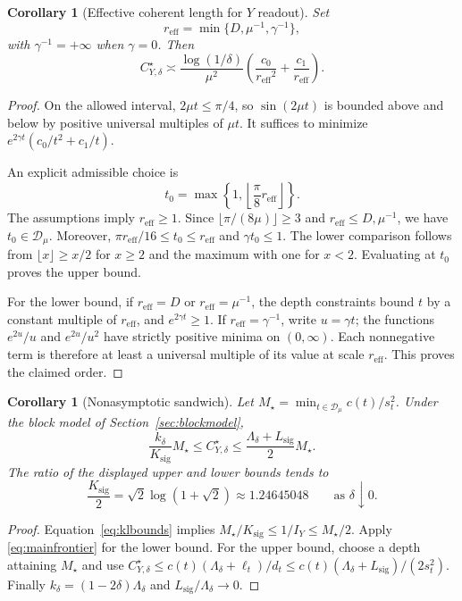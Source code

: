 \documentclass[11pt,a4paper]{article}
\newcommand{\reff}{r_{\mathrm{eff}}}
\newtheorem{corollary}[theorem]{Corollary}
\theoremstyle{definition}
\theoremstyle{remark}
\numberwithin{equation}{section}
\begin{document}
\begin{corollary}[Effective coherent length for $Y$ readout]\label{cor:effective}
Set
\begin{equation}
 {\reff}=\min\{D,\mu^{-1},\gamma^{-1}\},
\end{equation}
with $\gamma^{-1}=+\infty$ when $\gamma=0$. Then
\begin{equation}\label{eq:effectiver}
 C_{Y,\delta}^\star\asymp
 \frac{\log(1/\delta)}{\mu^2}
 \left(\frac{c_0}{{\reff}^2}+\frac{c_1}{{\reff}}\right).
\end{equation}
\end{corollary}
\begin{proof}
On the allowed interval, $2\mu t\leq\pi/4$, so
$\sin(2\mu t)$ is bounded above and below by positive universal multiples
of $\mu t$. It suffices to minimize
$e^{2\gamma t}(c_0/t^2+c_1/t)$.

An explicit admissible choice is
\[
 t_0=\max\left\{1,\left\lfloor\frac{\pi}{8}{\reff}\right\rfloor\right\}.
\]
The assumptions imply ${\reff}\geq1$. Since
$\lfloor\pi/(8\mu)\rfloor\geq3$ and ${\reff}\leq D,\mu^{-1}$,
we have $t_0\in\mathcal D_\mu$. Moreover,
$\pi{\reff}/16\leq t_0\leq{\reff}$ and $\gamma t_0\leq1$.
The lower comparison follows from $\lfloor x\rfloor\geq x/2$ for
$x\geq2$ and the maximum with one for $x<2$.
Evaluating at $t_0$ proves the upper bound.

For the lower bound, if ${\reff}=D$ or ${\reff}=\mu^{-1}$, the depth constraints
bound $t$ by a constant multiple of ${\reff}$, and $e^{2\gamma t}\geq1$.
If ${\reff}=\gamma^{-1}$, write $u=\gamma t$; the functions
$e^{2u}/u$ and $e^{2u}/u^2$ have strictly positive minima on $(0,\infty)$.
Each nonnegative term is therefore at least a universal multiple of its
value at scale ${\reff}$. This proves the claimed order.
\end{proof}

\begin{corollary}[Nonasymptotic sandwich]\label{cor:sandwich}
Let $M_\star=\min_{t\in\mathcal D_\mu}c(t)/s_t^2$. Under the block model of Section~\ref{sec:blockmodel},
\begin{equation}\label{eq:sandwich}
\frac{k_\delta}{K_{\mathrm{sig}}}M_\star
\le C_{Y,\delta}^\star
\le\frac{\Lambda_\delta+L_{\mathrm{sig}}}{2}M_\star.
\end{equation}
The ratio of the displayed upper and lower bounds tends to
\begin{equation}\label{eq:boost-sandwich-factor}
\frac{K_{\mathrm{sig}}}{2}=\sqrt2\log(1+\sqrt2)\approx1.24645048
\qquad\text{as }\delta\downarrow 0.
\end{equation}
\end{corollary}
\begin{proof}
Equation~\eqref{eq:klbounds} implies
$M_\star/K_{\mathrm{sig}}\le1/I_Y\le M_\star/2$. Apply
\eqref{eq:mainfrontier} for the lower bound. For the upper bound, choose a
depth attaining $M_\star$ and use
$C_{Y,\delta}^\star\le c(t)(\Lambda_\delta+\ell_t)/d_t
\le c(t)(\Lambda_\delta+L_{\mathrm{sig}})/(2s_t^2)$.
Finally $k_\delta=(1-2\delta)\Lambda_\delta$ and $L_{\mathrm{sig}}/\Lambda_\delta\to0$.
\end{proof}
\end{document}
